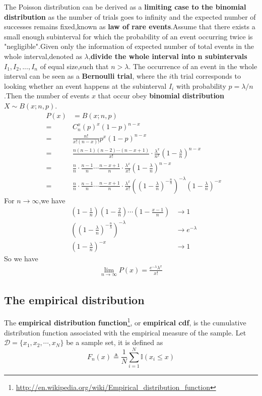The Poisson distribution can be derived as a \textbf{limiting case to the binomial distribution} as the number of trials goes to infinity and the expected number of successes remains fixed,known as \textbf{law of rare events}.Assume that there exists a small enough subinterval for which the probability of an event occurring twice is "negligible".Given only the information of expected number of total events in the whole interval,denoted as $\lambda$,\textbf{divide the whole interval into n subintervals} $I_1,I_2,...,I_n$ of equal size,such that $n > \lambda$. The occurrence of an event in the whole interval can be seen as a \textbf{Bernoulli trial}, where the $i$th  trial corresponds to looking whether an event happens at the subinterval $I_i$ with probability $p= \lambda / n$.Then the number of events $x$ that occur obey \textbf{binomial distribution} $X\sim B(x;n,p)$.
\begin{eqnarray*}
	& P(x) &= B(x;n,p)\\
	&=&C_n^x \left( p \right)^x \left( 1-p \right)^{n-x} \\
	&=&\frac{n!}{x!(n-x)!}p^x(1-p)^{n-x}\\
	&=&\frac{n(n-1)(n-2) \cdots (n-x+1)}{x!} \cdot \frac{\lambda^x}{n^x} \left( 1 - \frac{\lambda}{n} \right)^{n-x} \\
	&=&\frac{n}{n} \cdot \frac{n-1}{n} \cdots \frac{n-x+1}{n} \cdot \frac{\lambda^x}{x!}\left( 1 - \frac{\lambda}{n} \right)^{n-x} \\
	&=&\frac{n}{n} \cdot \frac{n-1}{n} \cdots \frac{n-x+1}{n} \cdot \frac{\lambda^x}{x!}
		\left(\left( 1 - \frac{\lambda}{n} \right)^{-\frac{n}{\lambda}}\right)^{-\lambda}\left( 1 - \frac{\lambda}{n} \right)^{-x}
\end{eqnarray*}
For $n \rightarrow \infty$,we have
\begin{align}
& (1-\frac{1}{n})(1-\frac{2}{n})\cdots(1-\frac{x-1}{n})&\rightarrow 1 \\
& \left(\left( 1 - \frac{\lambda}{n} \right)^{-\frac{n}{\lambda}}\right)^{-\lambda} &\rightarrow e^{-\lambda} \\
& (1-\frac{\lambda}{n})^{-x}&\rightarrow 1
\end{align}
So we have
\begin{align}
\lim_{n \rightarrow \infty} P(x) = \frac{e^{-\lambda} \lambda^x}{x!}
\end{align}

\subsection{The empirical distribution}
The \textbf{empirical distribution function}\footnote{\url{http://en.wikipedia.org/wiki/Empirical_distribution_function}}, or \textbf{empirical cdf}, is the cumulative distribution function associated with the empirical measure of the sample. Let $\mathcal{D}=\{x_1,x_2,\cdots,x_N\}$ be a sample set, it is defined as 
\begin{equation}
F_n(x) \triangleq \dfrac{1}{N}\sum\limits_{i=1}^N\mathbb{I}(x_i \leq x)
\end{equation}



